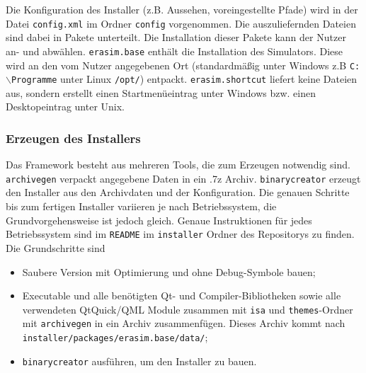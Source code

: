Die Konfiguration des Installer (z.B. Aussehen, voreingestellte Pfade) wird in
der Datei \texttt{config.xml} im Ordner \texttt{config} vorgenommen. Die
auszuliefernden Dateien sind dabei in Pakete unterteilt. Die Installation dieser
Pakete kann der Nutzer an- und abwählen. \texttt{erasim.base} enthält die
Installation des Simulators. Diese wird an den vom Nutzer angegebenen Ort
(standardmäßig unter Windows z.B \texttt{C:$\backslash$Programme} unter Linux
\texttt{/opt/}) entpackt. \texttt{erasim.shortcut} liefert keine Dateien aus,
sondern erstellt einen Startmenüeintrag unter Windows bzw. einen Desktopeintrag
unter Unix.

\subsubsection{Erzeugen des Installers}

Das Framework besteht aus mehreren Tools, die zum Erzeugen notwendig sind.
\texttt{archivegen} verpackt angegebene Daten in ein .7z Archiv.
\texttt{binarycreator} erzeugt den Installer aus den Archivdaten und der
Konfiguration. Die genauen Schritte bis zum fertigen Installer variieren je nach
Betriebssystem, die Grundvorgehensweise ist jedoch gleich. Genaue Instruktionen
für jedes Betriebssystem sind im \texttt{README} im \texttt{installer} Ordner
des Repositorys zu finden. Die Grundschritte sind
\begin{itemize}
	\item Saubere Version mit Optimierung und ohne Debug-Symbole bauen;

	\item Executable und alle benötigten Qt- und Compiler-Bibliotheken sowie alle
	verwendeten QtQuick/QML Module zusammen mit \texttt{isa} und
	\texttt{themes}-Ordner mit \texttt{archivegen} in ein Archiv zusammenfügen.
	Dieses Archiv kommt nach \texttt{installer/packages/erasim.base/data/};

	\item \texttt{binarycreator} ausführen, um den Installer zu bauen.
\end{itemize}
